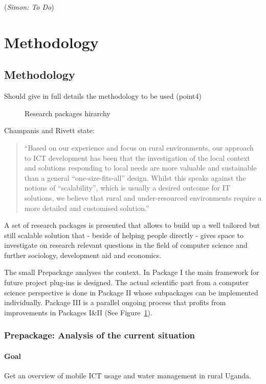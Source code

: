 \documentclass[11pt]{article}
\newcommand{\simon}[1]{\vspace{1em}(\emph{Simon: #1})\vspace{1em}}
\begin{document}
\simon{To Do}

\section{Methodology}\label{methodology}
\subsection{Methodology}\label{metho}
Should give in full details the methodology to be used (point4)

\begin{figure}
\begin{center}
 
\end{center}
\caption{Research packages hirarchy}
\label{tikz:researchpackages}
\end{figure} 

Champanis and Rivett \cite{champanis2012reporting} state: \begin{quote}
``Based on our experience and focus on rural environments, our
approach to ICT development has been that the investigation of
the local context and solutions responding to local needs are more
valuable and sustainable than a general “one-size-fits-all” design.
Whilst this speaks against the notions of “scalability”, which is
usually a desired outcome for IT solutions, we believe that rural
and under-resourced environments require a more detailed and
customised solution.''\end{quote} 

A set of research packages is presented that allows to build up a well tailored but still scalable solution that - beside of helping people directly -  gives space to investigate on research relevant questions in the field of computer science and further sociology, development aid and economics. 

The small Prepackage analyses the context. In Package I the main framework for future project plug-ins is designed. The actual scientific part from a computer science perspective is done in Package II whose subpackages can be implemented individually. Package III is a parallel ongoing process that profits from improvements in Packages I\&II (See Figure~\ref{tikz:researchpackages}).
\subsubsection*{Prepackage: Analysis of the current situation}
\paragraph{Goal} Get an overview of mobile ICT usage and water management in rural Uganda.
\end{document}
